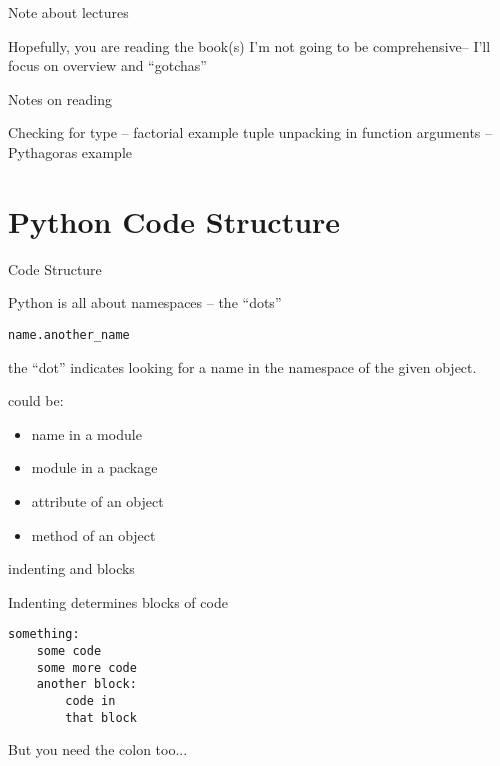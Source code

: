 \documentclass{beamer}
\begin{document}
\begin{frame}{Note about lectures}

{\LARGE
\vfill
Hopefully, you are reading the book(s)
\vfill
I'm not going to be comprehensive--
\vfill
I'll focus on overview and ``gotchas'' 
}
\end{frame}

\begin{frame}{Notes on reading}

{\LARGE
\vfill
Checking for type -- factorial example
\vfill
tuple unpacking in function arguments -- \\[0.2in]
Pythagoras example
}
\end{frame}



\section{Python Code Structure}

\begin{frame}[fragile]{Code Structure}

{\Large Python is all about namespaces --  the ``dots'' }

\vspace{0.2in}
\verb+name.another_name+
\vspace{0.2in}

the ``dot'' indicates looking for a name in the namespace of the given object.

could be:

\begin{itemize}
\item name in a module
\item module in a package
\item attribute of an object
\item method of an object
\end{itemize}

\end{frame}

\begin{frame}[fragile]{indenting and blocks}

{\Large  Indenting determines blocks of code }

\vfill
\begin{verbatim}
something:
    some code
    some more code
    another block:
        code in 
        that block
\end{verbatim}

\vfill
{\Large But you need the colon too...}

\end{frame}
\end{document}
